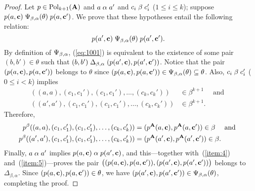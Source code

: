 \begin{proof}
    Let $p \in \operatorname{Pol}_{k+1}(\mathbf{A})$ and $a \mathrel{\alpha} a'$ and $c_i \mathrel{\beta} c_i'$ ($1\leq i\leq k$);
    suppose $p(a, \mathbf{c}) \mathrel{\Psi_{\beta, \alpha}(\theta)} p(a, \mathbf{c}')$.
    We prove that these hypotheses entail the following relation:
    \begin{equation}
      \label{eq:1001}
      p(a', \mathbf{c}) \mathrel{\Psi_{\beta, \alpha}(\theta)} p(a', \mathbf{c}').
    \end{equation}
    By definition of $\Psi_{\beta, \alpha}$, (\ref{eq:1001}) 
    is equivalent to the existence of
    some pair $(b,b') \in \theta$ such that
    $(b,b') \mathrel{\Delta_{\beta, \alpha}} (p(a', \mathbf{c}), p(a', \mathbf{c}'))$.
    Notice that the pair $(p(a, \mathbf{c}), p(a, \mathbf{c}'))$
    belongs to $\theta$ since
    $(p(a, \mathbf{c}), p(a, \mathbf{c}')) \in \Psi_{\beta, \alpha}(\theta) \subseteq \theta$.  Also,
    $c_i \mathrel{\beta} c_i'$ ($0\leq i<k$) implies
    \begin{align*}
    ((a,a), (c_1, c_1'), (c_1, c_1'), \dots, (c_{k}, c_{k}'))&\in \beta^{k+1} \quad \text{ and }\\
    ((a',a'), (c_1, c_1'), (c_1, c_1'), \dots, (c_{k}, c_{k}')) &\in \beta^{k+1}.
    \end{align*}
    Therefore,
    \begin{align}
      \label{item:4}
    p^{\beta}((a,a), (c_1, c_1'), (c_1, c_1'), \dots, (c_{k}, c_{k}'))
    &= (p^{\mathbf{A}}(a, \mathbf{c}), p^{\mathbf{A}}(a, \mathbf{c}')) \in \beta  \quad \text{ and }\\
    \label{item:5}
    p^{\beta}((a',a'), (c_1, c_1'), (c_1, c_1'), \dots, (c_{k}, c_{k}'))
    &= (p^{\mathbf{A}}(a', \mathbf{c}), p^{\mathbf{A}}(a', \mathbf{c}')) \in \beta.
    \end{align}
    Finally, $a\mathrel{\alpha} a'$ implies $p(a, \mathbf{c}) \mathrel{\alpha} p(a', \mathbf{c})$, and this---together
    with~(\ref{item:4}) and~(\ref{item:5})---proves the pair
    $\bigl((p(a, \mathbf{c}), p(a, \mathbf{c}')), (p(a', \mathbf{c}), p(a', \mathbf{c}'))\bigr)$
    belongs to  $\mathrel{\Delta_{\beta, \alpha}}$.
    Since  $(p(a, \mathbf{c}), p(a, \mathbf{c}')) \in \theta$, we have
    $(p(a', \mathbf{c}), p(a', \mathbf{c}')) \in \Psi_{\beta, \alpha}(\theta)$, completing the proof.
  \end{proof}








